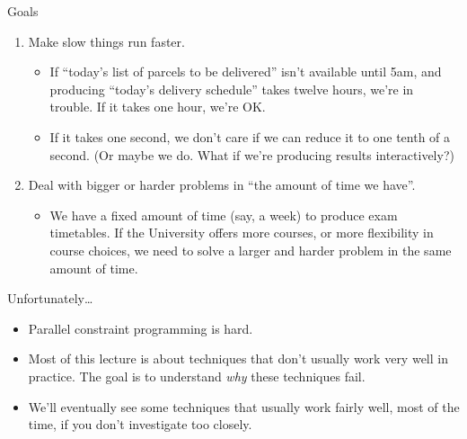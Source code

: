\documentclass[aspectratio=169,compress,10pt]{beamer}
\begin{document}
\begin{frame}{Goals}
    \begin{enumerate}
        \item Make slow things run faster.
            \begin{itemize}
                \item If ``today's list of parcels to be delivered'' isn't available until 5am, and
                    producing ``today's delivery schedule'' takes twelve hours, we're in trouble. If
                    it takes one hour, we're OK.

                \item If it takes one second, we don't care if we can reduce it to one tenth of a
                    second. (Or maybe we do. What if we're producing results interactively?)
            \end{itemize}

        \item Deal with bigger or harder problems in ``the amount of time we have''.
            \begin{itemize}
                \item We have a fixed amount of time (say, a week) to produce exam timetables. If
                    the University offers more courses, or more flexibility in course choices, we
                    need to solve a larger and harder problem in the same amount of time.
            \end{itemize}
    \end{enumerate}
\end{frame}

\begin{frame}{Unfortunately\ldots}
    \begin{itemize}
        \item Parallel constraint programming is hard.
        \item Most of this lecture is about techniques that don't usually work very well in
            practice. The goal is to understand \emph{why} these techniques fail.
        \item We'll eventually see some techniques that usually work fairly well, most of the time,
            if you don't investigate too closely.
    \end{itemize}
\end{frame}
\end{document}
